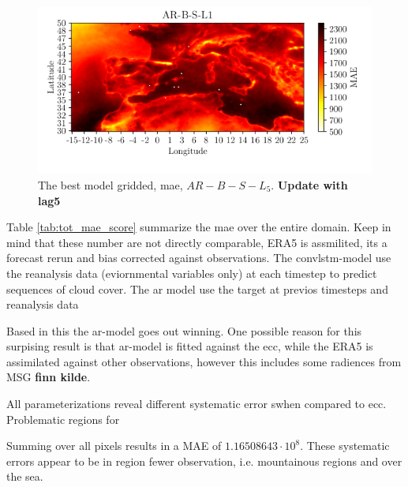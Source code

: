 \begin{figure}
    \centering
    \includegraphics{python_figs/mea_best_ar_model_tcc_L1_in_folder_AR-B-S-L1.png}
    \caption{The best model gridded, \acrshort{mae}, $AR-B-S-L_5$. \textbf{Update with lag5}}
    \label{fig:MAE_AR}
\end{figure}

Table \ref{tab:tot_mae_score} summarize the \acrshort{mae} over the entire domain. Keep in mind that these number are not directly comparable, ERA5 is assmilited, its a forecast rerun and bias corrected against observations. The \acrshort{convlstm}-model use the reanalysis data (eviornmental variables only) at each timestep to predict sequences of cloud cover. The ar model use the target at previos timesteps and reanalysis data 

Based in this the \acrshort{ar}-model goes out winning. One possible reason for this surpising result is that \acrshort{ar}-model is fitted against the \acrshort{ecc}, while 
the ERA5 is assimilated against other observations, however this includes some radiences from MSG \textbf{finn kilde}. 

All parameterizations reveal different systematic error swhen compared to \acrshort{ecc}.
Problematic regions for 

Summing over all pixels results in a MAE of $1.16508643\cdot10^8$. These systematic errors appear to be in region fewer observation, i.e. mountainous regions and over the sea. %


